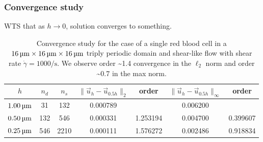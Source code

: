 \subsubsection{Convergence study}
\bgroup\color{red}
WTS that as $h\to 0$, solution converges to something.
\egroup

\begin{table}
    \begin{center}
        \begingroup
        \setlength{\tabcolsep}{9pt}
        \renewcommand{\arraystretch}{1.5}
        \begin{tabular}{ccc|cc|cc}
                                                                                                                                         \\ \toprule
            $h$       & $n_d$ & $n_s$ & $\|\vec{u}_h-\vec{u}_{0.5h}\|_2$ & order    & $\|\vec{u}_h-\vec{u}_{0.5h}\|_{\infty}$ & order    \\ \midrule
            $1.00\um$ & 31    & 132   & 0.000789                         &          & 0.006200                                &          \\
            $0.50\um$ & 132   & 546   & 0.000331                         & 1.253194 & 0.004700                                & 0.399607 \\
            $0.25\um$ & 546   & 2210  & 0.000111                         & 1.576272 & 0.002486                                & 0.918834 \\ \bottomrule
        \end{tabular}
        \endgroup
    \end{center}
    \caption{%
        Convergence study for the case of a single red blood cell in a
        $16\um\times16\um\times16\um$ triply periodic domain and shear-like
        flow with shear rate $\dot{\gamma} = 1000\si{\per\second}$. We observe
        order \textasciitilde1.4 convergence in the $\ell_2$ norm and order
        \textasciitilde0.7 in the max norm.
    }
\end{table}
